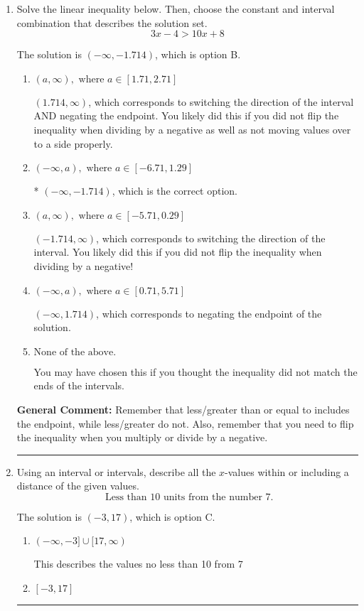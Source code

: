 \documentclass{extbook}[14pt]
\newcommand{\litem}[1]{\item #1

\rule{\textwidth}{0.4pt}}
\begin{document}
\begin{enumerate}\litem{
Solve the linear inequality below. Then, choose the constant and interval combination that describes the solution set.
\[ 3x -4 > 10x + 8 \]

The solution is \( (-\infty, -1.714) \), which is option B.\begin{enumerate}[label=\Alph*.]
\item \( (a, \infty), \text{ where } a \in [1.71, 2.71] \)

 $(1.714, \infty)$, which corresponds to switching the direction of the interval AND negating the endpoint. You likely did this if you did not flip the inequality when dividing by a negative as well as not moving values over to a side properly.
\item \( (-\infty, a), \text{ where } a \in [-6.71, 1.29] \)

* $(-\infty, -1.714)$, which is the correct option.
\item \( (a, \infty), \text{ where } a \in [-5.71, 0.29] \)

 $(-1.714, \infty)$, which corresponds to switching the direction of the interval. You likely did this if you did not flip the inequality when dividing by a negative!
\item \( (-\infty, a), \text{ where } a \in [0.71, 5.71] \)

 $(-\infty, 1.714)$, which corresponds to negating the endpoint of the solution.
\item \( \text{None of the above}. \)

You may have chosen this if you thought the inequality did not match the ends of the intervals.
\end{enumerate}

\textbf{General Comment:} Remember that less/greater than or equal to includes the endpoint, while less/greater do not. Also, remember that you need to flip the inequality when you multiply or divide by a negative.
}
\litem{
Using an interval or intervals, describe all the $x$-values within or including a distance of the given values.
\[ \text{ Less than } 10 \text{ units from the number } 7. \]

The solution is \( (-3, 17) \), which is option C.\begin{enumerate}[label=\Alph*.]
\item \( (-\infty, -3] \cup [17, \infty) \)

This describes the values no less than 10 from 7
\item \( [-3, 17] \)


\end{enumerate}}
\end{enumerate}
\end{document}
